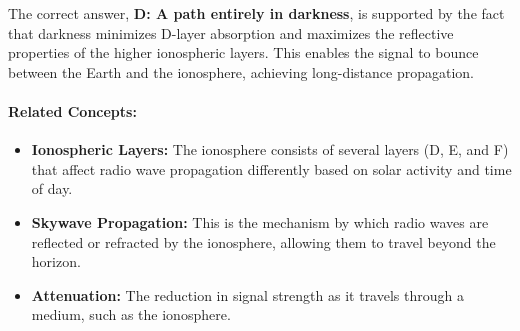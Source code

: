 The correct answer, \textbf{D: A path entirely in darkness}, is supported by the fact that darkness minimizes D-layer absorption and maximizes the reflective properties of the higher ionospheric layers. This enables the signal to bounce between the Earth and the ionosphere, achieving long-distance propagation.

\paragraph{Related Concepts:}
\begin{itemize}
    \item \textbf{Ionospheric Layers:} The ionosphere consists of several layers (D, E, and F) that affect radio wave propagation differently based on solar activity and time of day.
    \item \textbf{Skywave Propagation:} This is the mechanism by which radio waves are reflected or refracted by the ionosphere, allowing them to travel beyond the horizon.
    \item \textbf{Attenuation:} The reduction in signal strength as it travels through a medium, such as the ionosphere.
\end{itemize}

